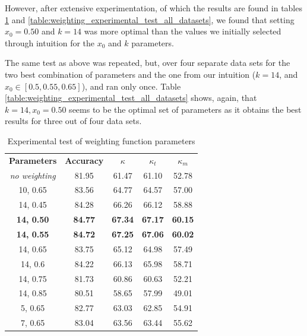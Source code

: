 However, after extensive experimentation, of which the results are found in tables \ref{table:weighting_experimental_test} and \ref{table:weighting_experimental_test_all_datasets}, we found that setting \textbf{$x_0=0.50$} and \textbf{$k=14$} was more optimal than the values we initially selected through intuition for the $x_0$ and $k$ parameters.

The same test as above was repeated, but, over four separate data sets for the two best combination of parameters and the one from our intuition ($k=14$, and $x_0 \in [0.5, 0.55, 0.65]$), and ran only once. Table \ref{table:weighting_experimental_test_all_datasets} shows, again, that $k=14, x_0=0.50$ seems to be the optimal set of parameters as it obtains the best results for three out of four data sets.

\begin{table}[]
\caption{\label{table:weighting_experimental_test}Experimental test of weighting function parameters}
\centering
\begin{tabular}{|c|c|c|c|c|}
\hline
\textbf{Parameters} & \textbf{Accuracy} & \textbf{$\kappa$} & \textbf{$\kappa_t$} & \textbf{$\kappa_m$} \\ \hhline{=====}
\textit{no weighting}&81.95&61.47&61.10&52.78 \\ \hline
10, 0.65&83.56&64.77&64.57&57.00 \\ \hline
14, 0.45&84.28&66.26&66.12&58.88 \\ \hline
\textbf{14, 0.50}&\textbf{84.77}&\textbf{67.34}&\textbf{67.17}&\textbf{60.15} \\ \hline
\textbf{14, 0.55}&\textbf{84.72}&\textbf{67.25}&\textbf{67.06}&\textbf{60.02} \\ \hline
14, 0.65&83.75&65.12&64.98&57.49 \\ \hline
14, 0.6&84.22&66.13&65.98&58.71 \\ \hline
14, 0.75&81.73&60.86&60.63&52.21 \\ \hline
14, 0.85&80.51&58.65&57.99&49.01 \\ \hline
5, 0.65&82.77&63.03&62.85&54.91 \\ \hline
7, 0.65&83.04&63.56&63.44&55.62 \\ \hline
\end{tabular}
\end{table}

